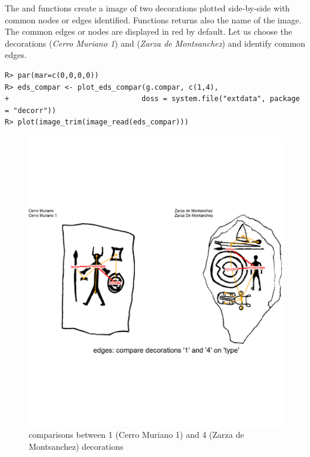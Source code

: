 \documentclass[article]{jss}\usepackage{knitr}
\begin{document}
The and  functions create a  image of two decorations plotted side-by-side with common nodes or edges identified. Functions returns also the name of the image. The common edges or nodes are displayed in red by default. 
Let us choose the decorations  (\emph{Cerro Muriano 1}) and  (\emph{Zarza de Montsanchez}) and identify common edges.

\begin{kframe}
\begin{verbatim}
R> par(mar=c(0,0,0,0))
R> eds_compar <- plot_eds_compar(g.compar, c(1,4),
+                               doss = system.file("extdata", package = "decorr"))
R> plot(image_trim(image_read(eds_compar)))
\end{verbatim}
\end{kframe}\begin{figure}[H]

{\centering \includegraphics[width=\maxwidth]{figure/unnamed-chunk-12-1} 

}

\caption{\label{fig:figs}comparisons between 1 (Cerro Muriano 1) and 4 (Zarza de Montsanchez) decorations}\label{fig:unnamed-chunk-12}
\end{figure}
\end{document}
